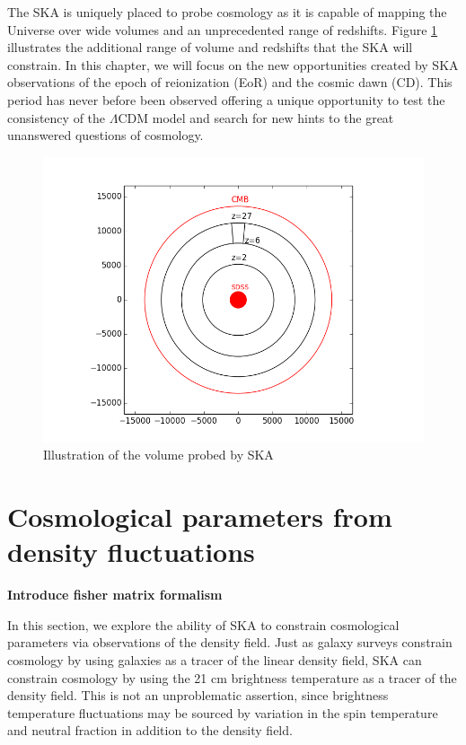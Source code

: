 \documentclass{PoS}
\begin{document}
The SKA is uniquely placed to probe cosmology as it is capable of mapping the Universe over wide volumes and an unprecedented range of redshifts. Figure \ref{fig:volume} illustrates the additional range of volume and redshifts that the SKA will constrain. In this chapter, we will focus on the new opportunities created by SKA observations of the epoch of reionization (EoR) and the cosmic dawn (CD). This period has never before been observed offering a unique opportunity to test the consistency of the $\Lambda$CDM model and search for new hints to the great unanswered questions of cosmology.

\begin{figure}[htbp]
\begin{center}
\includegraphics[scale=0.6]{figures/plotcircles.png}
\caption{Illustration of the volume probed by SKA}
\label{fig:volume}
\end{center}
\end{figure}

\cite{furlanetto2006dm}

\section{Cosmological parameters from density fluctuations}

{\bf Introduce fisher matrix formalism}

In this section, we explore the ability of SKA to constrain cosmological parameters via observations of the density field. Just as galaxy surveys constrain cosmology by using galaxies as a tracer of the linear density field, SKA can constrain cosmology by using the 21 cm brightness temperature as a tracer of the density field. This is not an unproblematic assertion, since brightness temperature fluctuations may be sourced by variation in the spin temperature and neutral fraction in addition to the density field. 
\end{document}
